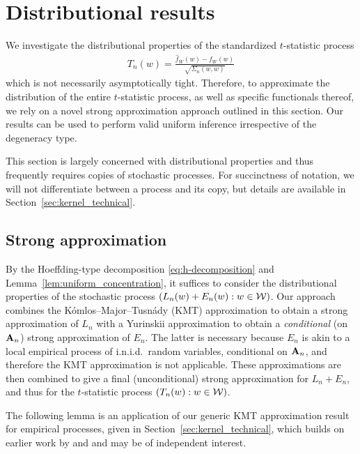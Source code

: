 \section{Distributional results}\label{sec:kernel_inference}

We investigate the distributional properties of the
standardized $t$-statistic process
%
\begin{align*}
  T_n(w) = \frac{\hat{f}_W(w) - f_W(w)}{\sqrt{\Sigma_n(w,w)}}
\end{align*}
%
which is not necessarily asymptotically tight. Therefore, to approximate the
distribution of the entire $t$-statistic process, as well as specific
functionals thereof, we rely on a novel strong approximation approach outlined
in this section. Our results can be used to perform valid uniform inference
irrespective of the degeneracy type.

This section is largely concerned with distributional properties and thus
frequently requires copies of stochastic processes. For succinctness of
notation, we will not differentiate between a process and its copy, but details
are available in Section~\ref{sec:kernel_technical}.

\subsection{Strong approximation}

By the Hoeffding-type decomposition \eqref{eq:h-decomposition} and
Lemma~\ref{lem:uniform_concentration}, it suffices to consider the
distributional properties of the stochastic process $(L_n(w)+E_n(w):w\in\mathcal{W})$.
Our approach combines the K{\'o}mlos--Major--Tusn{\'a}dy (KMT) approximation
\citep{komlos1975approximation} to obtain a strong approximation of $L_n$ with
a Yurinskii approximation \citep{yurinskii1978error} to obtain a
\emph{conditional} (on $\mathbf{A}_n$) strong approximation of $E_n$. The latter is
necessary because $E_n$ is akin to a local empirical process of i.n.i.d.\
random variables, conditional on $\mathbf{A}_n$, and therefore the KMT approximation
is not applicable. These approximations are then combined to give a final
(unconditional) strong approximation for $L_n+E_n$, and thus for the
$t$-statistic process $(T_n(w):w\in\mathcal{W})$.

The following lemma is an application of our generic KMT approximation result
for empirical processes, given in Section~\ref{sec:kernel_technical}, which
builds on earlier work by \citet{gine2004kernel} and \citet{gine2010confidence}
and may be of independent interest.

